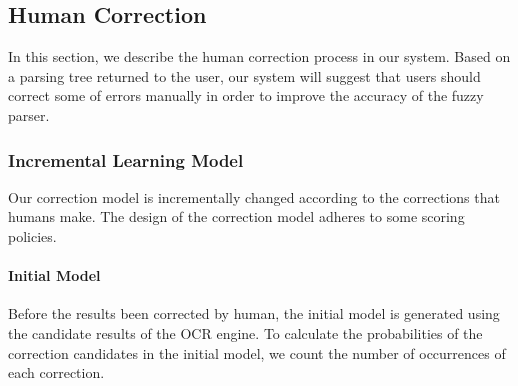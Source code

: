 \subsection{Human Correction}
\label{sec:correction}
In this section, we describe the human correction process in our system. 
Based on a parsing tree returned to the user, 
our system will suggest that users should correct some of errors manually in order to improve the accuracy of the fuzzy parser. 

\subsubsection{Incremental Learning Model}
\label{sec:incremental}
Our correction model is incrementally changed according to the corrections that 
humans make. The design of the correction model adheres to some 
scoring policies. 

\paragraph{Initial Model}
Before the results been corrected by human, 
the initial model is generated using the candidate results of the OCR 
engine. 
To calculate the probabilities of the correction candidates in the initial 
model, we count the number of occurrences of each correction. 

